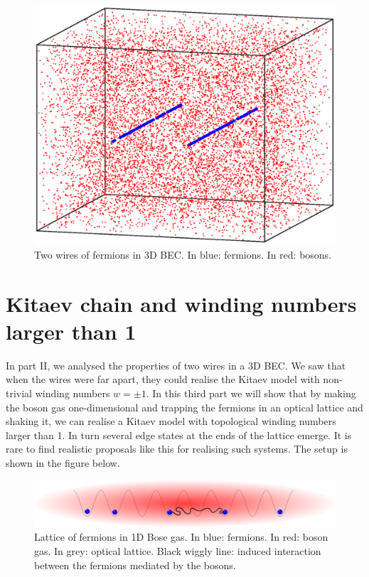 \documentclass[11pt, twoside]{Thesis}
\begin{document}
\vspace{2.5cm}

\begin{figure}[H]
\center
\includegraphics[width=0.8\columnwidth]{gasandwires3.eps}
\\ Two wires of fermions in 3D BEC. In blue: fermions. In red: bosons.  
\end{figure}

\newpage


 
 
 

\part{Kitaev chain and winding numbers larger than 1}
\fancyhead[LE,RO]{\thepage}
In part II, we analysed the properties of two wires in a 3D BEC. We saw that when the wires were far apart, they could realise the Kitaev model with non-trivial winding numbers $w = \pm 1$. In this third part we will show that by making the boson gas one-dimensional and trapping the fermions in an optical lattice and shaking it, we can realise a Kitaev model with topological winding numbers larger than 1. In turn several edge states at the ends of the lattice emerge. It is rare to find realistic proposals like this for realising such systems. The setup is shown in the figure below. 

\vspace{2.5cm}

\begin{figure}[H]
\center
\includegraphics[width=1\columnwidth]{gasandlattice.eps}
\\ Lattice of fermions in 1D Bose gas. In blue: fermions. In red: boson gas. In grey: optical lattice. Black wiggly line: induced interaction between the fermions mediated by the bosons.   
\end{figure}
\end{document}
